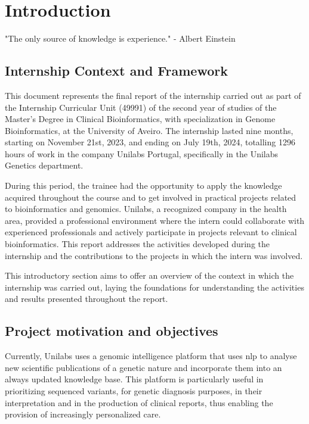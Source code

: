 \chapter{Introduction} 
\label{chapter:introduction}

\begin{introduction}
    "The only source of knowledge is experience." - Albert Einstein
\end{introduction}



\section{Internship Context and Framework} \label{sec:intro_context}

This document represents the final report of the internship carried out as part of the Internship Curricular Unit (49991) of the second year of studies of the Master's Degree in Clinical Bioinformatics, with specialization in Genome Bioinformatics, at the University of Aveiro. The internship lasted nine months, starting on November 21st, 2023, and ending on July 19th, 2024, totalling 1296 hours of work in the company Unilabs Portugal, specifically in the Unilabs Genetics department. 

During this period, the trainee had the opportunity to apply the knowledge acquired throughout the course and to get involved in practical projects related to bioinformatics and genomics. Unilabs, a recognized company in the health area, provided a professional environment where the intern could collaborate with experienced professionals and actively participate in projects relevant to clinical bioinformatics. This report addresses the activities developed during the internship and the contributions to the projects in which the intern was involved. 

This introductory section aims to offer an overview of the context in which the internship was carried out, laying the foundations for understanding the activities and results presented throughout the report.


\section{Project motivation and objectives} \label{sec:intro_motivation}

Currently, Unilabs uses a genomic intelligence platform that uses \ac{nlp} to analyse new scientific publications of a genetic nature and incorporate them into an always updated knowledge base. This platform is particularly useful in prioritizing sequenced variants, for genetic diagnosis purposes, in their interpretation and in the production of clinical reports, thus enabling the provision of increasingly personalized care. 

